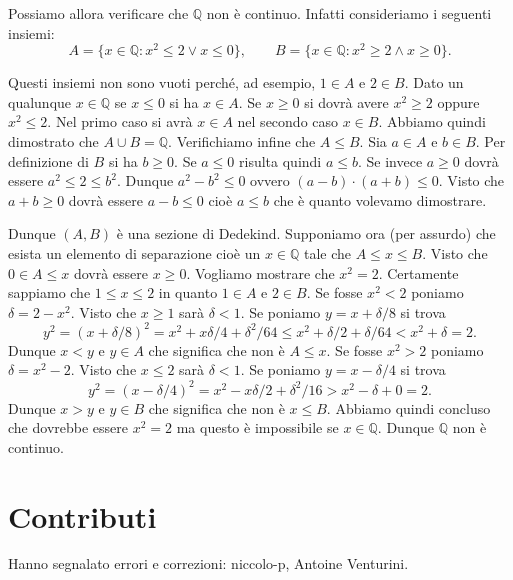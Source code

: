 \documentclass[italian,a4paper,hidelinks,headinclude]{scrartcl}
\newcommand{\QQ}{{\mathbb Q}}
\begin{document}
Possiamo allora verificare che $\QQ$ non è continuo.
Infatti consideriamo i seguenti insiemi:
\[
  A=\{x\in \QQ\colon x^2 \le 2 \lor x\le 0\}, \qquad
  B=\{x\in \QQ\colon x^2 \ge 2 \land x\ge 0\}.
\]

Questi insiemi non sono vuoti perché, ad esempio, $1\in A$ e $2\in B$.
Dato un qualunque $x\in \QQ$ se $x\le 0$ si ha $x\in A$. Se $x\ge 0$ si dovrà avere
$x^2 \ge 2$ oppure $x^2\le 2$. Nel primo caso si avrà $x\in A$ nel
secondo caso $x\in B$. Abbiamo quindi dimostrato che $A \cup B = \QQ$.
Verifichiamo infine che $A \le B$. Sia $a\in A$ e $b\in B$.
Per definizione di $B$ si ha $b\ge 0$. Se $a\le 0$ risulta quindi $a \le b$.
Se invece $a\ge 0$ dovrà essere $a^2 \le 2 \le b^2$.
Dunque $a^2 - b^2 \le 0$ ovvero $(a-b)\cdot (a+b)\le 0$.
Visto che $a+b\ge 0$ dovrà essere $a-b\le 0$ cioè $a\le b$ che è quanto volevamo
dimostrare.

Dunque $(A,B)$ è una sezione di Dedekind.
Supponiamo ora (per assurdo) che esista un elemento di separazione cioè
un $x\in \QQ$ tale che $A \le x \le B$. Visto che $0\in A \le x$
dovrà essere $x\ge 0$. Vogliamo mostrare che $x^2 = 2$.
Certamente sappiamo che $1\le x \le 2$ in quanto $1 \in A$ e $2\in B$.
Se fosse $x^2 < 2$
poniamo $\delta = 2 - x^2$. Visto che $x\ge 1$ sarà $\delta < 1$.
Se poniamo $y=x+\delta/8$ si trova
\[
  y^2 = (x+\delta/8)^2 = x^2 + x \delta/4 + \delta^2/64
  \le x^2 + \delta/2 + \delta/64 < x^2 + \delta = 2.
\]
Dunque $x < y$ e $y\in A$ che significa che non è $A \le x$.
Se fosse $x^2>2$ poniamo $\delta = x^2-2$. Visto che $x\le 2$ sarà $\delta <1$.
Se poniamo $y=x-\delta/4$ si trova
\[
  y^2 = (x-\delta/4)^2 = x^2 - x \delta/2 + \delta^2/16
  > x^2 - \delta + 0  = 2.
\]
Dunque $x > y$ e $y\in B$ che significa che non è $x\le B$.
Abbiamo quindi concluso che dovrebbe essere $x^2=2$ ma
questo è impossibile se $x\in \QQ$. Dunque $\QQ$ non è continuo.



%
\section{Contributi}

Hanno segnalato errori e correzioni:
niccolo-p,
Antoine Venturini.
\end{document}
